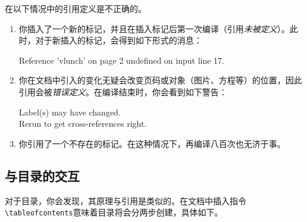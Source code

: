 在以下情况中的引用定义是不正确的。

\begin{enumerate}
  \item 你插入了一个新的标记，并且在插入标记后第一次编译（引用\emph{未被定义}）。此时，对于新插入的标记，会得到如下形式的消息：
  
  \begin{dmd}
  Reference 'vlunch' on page 2 undefined on input line 17.
  \end{dmd}

  \item 你在文档中引入的变化无疑会改变页码或对象（图片、方程等）的位置，因此引用会被\emph{错误定义}。在编译结束时，你会看到如下警告：
  
  \begin{dmd}
  Label(s) may have changed.\\
  Rerun to get cross-references right.
  \end{dmd}

  \item 你引用了一个不存在的标记。在这种情况下，再编译八百次也无济于事。
\end{enumerate}

\subsection{与目录的交互}

对于目录，你会发现，其原理与引用是类似的。在文档中插入指令\verb|\tableofcontents|意味着目录将会分两步创建，具体如下。

